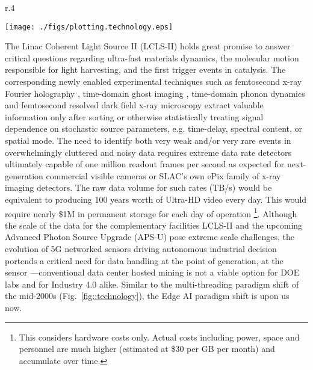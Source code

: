 \documentclass{article}
\begin{document}
\begin{wrapfigure}[23]{r}{.4\linewidth}
	\vspace{-1.5\baselineskip}
	\centerline{ \texttt{[image: ./figs/plotting.technology.eps]} }
	\vspace{-1\baselineskip}
	\caption{
		\label{fig::technology} 
		Adapted from Ref.~\cite{MicroprocessorTrendData}. Note that the limitations in the mid-2000s triggered the multi-threading paradigm.
	}
\end{wrapfigure}
The Linac Coherent Light Source II (LCLS-II) holds great promise to answer critical questions regarding ultra-fast materials dynamics, the molecular motion responsible for light harvesting, and the first trigger events in catalysis. 
The corresponding newly enabled experimental techniques such as femtosecond x-ray Fourier holography \cite{Tais2018}, time-domain ghost imaging \cite{Taran2020}, time-domain phonon dynamics \cite{Mariano2013,Abbamonte2013} and femtosecond resolved dark field x-ray microscopy \cite{Simons2015} extract valuable information only after sorting or otherwise statistically treating signal dependence on stochastic source parameters, e.g. time-delay, spectral content, or spatial mode.
The need to identify both very weak and/or very rare events in overwhelmingly cluttered and noisy data requires extreme data rate detectors ultimately capable of one million readout frames per second as expected for next-generation commercial visible cameras or SLAC's own ePix family of x-ray imaging detectors. 
The raw data volume for such rates (TB/s) \cite{lcls_processing} would be equivalent to producing 100 years worth of Ultra-HD video \cite{HowBigVideo} every day.  
This would require nearly \$1M in permanent storage for each day of operation \cite{CostPerTB}
\footnote{This considers hardware costs only. Actual costs including power, space and personnel are much higher (estimated at \$30 per GB per month) and accumulate over time.}.
Although the scale of the data for the complementary facilities LCLS-II and the upcoming Advanced Photon Source Upgrade (APS-U) pose extreme scale challenges, the evolution of 5G networked sensors driving autonomous industrial decision portends a critical need for data handling at the point of generation, at the sensor \cite{Gartner2018,NetworkWorld2019}---conventional data center hosted mining is not a viable option for DOE labs and for Industry 4.0 alike.
Similar to the multi-threading paradigm shift of the mid-2000s (Fig.~\ref{fig::technology}), the Edge AI paradigm shift is upon us now.
\end{document}
